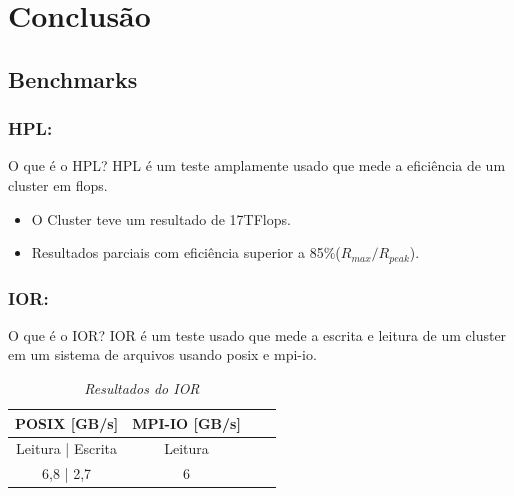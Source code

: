 \documentclass[10pt]{beamer}
\begin{document}
\section{Conclusão}
	\subsection{Benchmarks}
		\begin{frame}
		\frametitle{HPL:}
			\begin{block}{O que é o HPL?}
				HPL é um teste amplamente usado que mede a eficiência de um cluster em flops.
			\end{block}
			\begin{itemize}%
				\item O Cluster teve um resultado de 17TFlops.
				\item Resultados parciais com eficiência superior a 85\%($R_{max}/R_{peak}$).
			\end{itemize}
		\end{frame}

		\begin{frame}
		\frametitle{IOR:}
			\begin{block}{O que é o IOR?}
				IOR é um teste usado que mede a escrita e leitura de um cluster em um sistema de arquivos usando posix e mpi-io.
			\end{block}
			\begin{table}[htb] %
				\centering   %
				\large       %
				\setlength{\arrayrulewidth}{2\arrayrulewidth}  %
				\setlength{\belowcaptionskip}{10pt}  %
				\caption{\it Resultados do IOR}
				\begin{tabular}{|c|c|c|c|} %
					\hline
					POSIX [GB/s] & MPI-IO [GB/s] \\
					\hline \hline
					Leitura | Escrita  & Leitura \\
					\hline \hline
					6,8 | 2,7 & 6 \\
					\hline
				\end{tabular}
				\label{tab:res_ior}
			\end{table}
		\end{frame}
\end{document}
